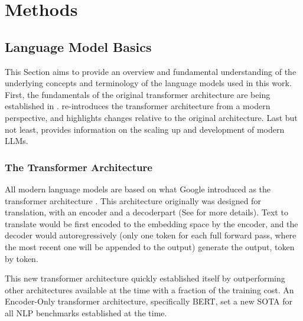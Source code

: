 \chapter{Methods}\label{chap:methods}


\section{Language Model Basics}\label{sec:basics}
This Section aims to provide an overview and fundamental understanding of the underlying concepts and terminology of the language models used in this work.
First, the fundamentals of the original transformer architecture are being established in .
 re-introduces the transformer architecture from a modern perspective, and highlights changes relative to the original architecture.
Last but not least,  provides information on the scaling up and development of modern \glspl{LLM}.



\subsection{The Transformer Architecture}\label{sub:transformer}
All modern language models are based on what \gls{Google} introduced as the transformer architecture \cite{vaswani_attention_2017}.
This architecture originally was designed for translation, with an encoder and a decoderpart (See  for more details).
Text to translate would be first encoded to the embedding space by the encoder, and the decoder would autoregressively (only one token for each full forward pass, where the most recent one will be appended to the output) generate the output, token by token.

This new transformer architecture quickly established itself by outperforming other architectures available at the time with a fraction of the training cost.
An Encoder-Only transformer architecture, specifically \gls{BERT}, set a new \gls{SOTA} for all \gls{NLP} benchmarks established at the time.

